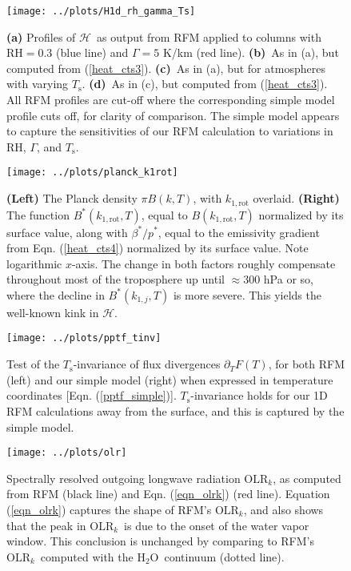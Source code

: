 \documentclass{ametsoc}
\newcommand{\eqnref}[1]{(\ref{#1})}
\newcommand{\ppt}{\ensuremath{\partial_T}}
\newcommand{\Ts}{\ensuremath{T_\mathrm{s}}}
\newcommand{\htwo}{\ensuremath{\mathrm{H_2O}}}
\newcommand{\RH}{\ensuremath{\mathrm{RH}}}
\newcommand{\OLRk}{\ensuremath{\mathrm{OLR}_k}}
\newcommand{\ch}{\ensuremath{\mathcal{H}}}
\newcommand{\konerot}{\ensuremath{k_{1,\mathrm{rot}}}}
\newcommand{\konej}{\ensuremath{k_{1,j}}}
\begin{document}
\begin{figure}[h]
	\begin{center}
			\texttt{[image: ../plots/H1d\_rh\_gamma\_Ts]}
		\caption{\textbf{(a)} Profiles of \ch\ as output from RFM applied to columns with $\RH=0.3$ (blue line) and $\Gamma=5$ K/km (red line). 
					\textbf{(b)}\ As in (a), but computed from \eqnref{heat_cts3}. 
					\textbf{(c)}\ As in (a), but for atmospheres with varying \Ts.
					\textbf{(d)}\ As in (c), but computed from \eqnref{heat_cts3}. 
					All RFM profiles are cut-off where the corresponding simple model profile cuts off, for clarity of comparison. The simple model appears to capture the sensitivities of our RFM calculation to variations in \RH, $\Gamma$, and \Ts.
		\label{H1d_rh_gamma_Ts}
		}
	\end{center}
\end{figure}

\begin{figure}[h]
	\begin{center}
			\texttt{[image: ../plots/planck\_k1rot]}
		\caption{\textbf{(Left)} The Planck density $\pi B(k,T)$, with $\konerot$ overlaid. \textbf{(Right)} The function $B^*(\konerot,T)$, equal to $B(\konerot,T)$ normalized by its surface value, along with $\beta^*/p^*$, equal to the emissivity gradient from Eqn. \eqnref{heat_cts4} normalized by its surface value.  Note logarithmic $x$-axis. The change in both factors roughly compensate throughout most of the troposphere up until $\approx 300$ hPa or so, where the decline in $B^*(\konej,T)$ is more severe. This yields the well-known kink in \ch. 
		\label{planck_k1rot}
		}
	\end{center}
\end{figure}

\begin{figure}[h]
	\begin{center}
			\texttt{[image: ../plots/pptf\_tinv]}
		\caption{Test of the \Ts-invariance of flux divergences $\ppt F(T)$, for both RFM (left) and our simple model (right) when expressed in temperature coordinates [Eqn. \eqnref{pptf_simple}]. \Ts-invariance holds for our 1D RFM calculations away from the surface, and this is captured by the simple model.
		\label{pptf_tinv}
		}
	\end{center}
\end{figure}

\begin{figure}[h]
	\begin{center}
			\texttt{[image: ../plots/olr]}
		\caption{Spectrally resolved outgoing longwave radiation \OLRk, as computed from RFM (black line) and Eqn. \eqnref{eqn_olrk} (red line). Equation \eqnref{eqn_olrk} captures the shape of RFM's \OLRk, and also shows that the peak in \OLRk\ is due to the onset of the water vapor window. This conclusion is unchanged by comparing to RFM's \OLRk\ computed with the \htwo\ continuum (dotted line).
		\label{olr}
		}
	\end{center}
\end{figure}
\end{document}
